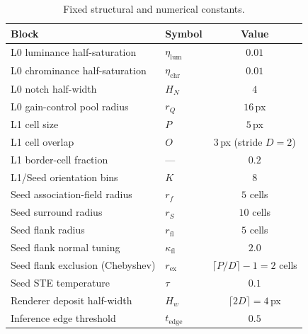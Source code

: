 \documentclass[11pt,a4paper]{article}
\begin{document}
\begin{table}[h]
\centering
\caption{Fixed structural and numerical constants.}
\label{tab:fixed-params}
\renewcommand{\arraystretch}{1.15}
\begin{tabular}{llc}
\toprule
Block & Symbol & Value\\
\midrule
L0 luminance half-saturation & $\eta_{\mathrm{lum}}$ & $0.01$ \\
L0 chrominance half-saturation & $\eta_{\mathrm{chr}}$ & $0.01$ \\
L0 notch half-width & $H_N$ & $4$ \\
L0 gain-control pool radius & $r_Q$ & $16$\,px \\
L1 cell size & $P$ & $5$\,px \\
L1 cell overlap & $O$ & $3$\,px (stride $D = 2$) \\
L1 border-cell fraction & --- & $0.2$ \\
L1/Seed orientation bins & $K$ & $8$ \\
Seed association-field radius & $r_f$ & $5$ cells \\
Seed surround radius & $r_S$ & $10$ cells \\
Seed flank radius & $r_{\mathrm{fl}}$ & $5$ cells \\
Seed flank normal tuning & $\kappa_{\mathrm{fl}}$ & $2.0$ \\
Seed flank exclusion (Chebyshev) & $r_{\mathrm{ex}}$ & $\lceil P/D \rceil - 1 = 2$ cells \\
Seed STE temperature & $\tau$ & $0.1$ \\
Renderer deposit half-width & $H_w$ & $\lceil 2 D \rceil = 4$\,px \\
Inference edge threshold & $t_{\mathrm{edge}}$ & $0.5$ \\
\bottomrule
\end{tabular}
\end{table}
\end{document}
